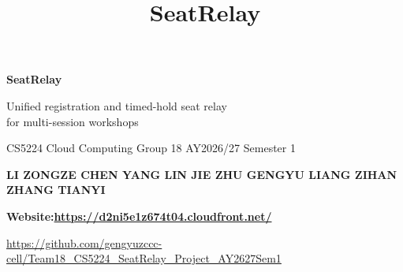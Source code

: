 \documentclass[t,20pt]{beamer}
\title{SeatRelay}
\newcommand{\hl}[1]{\textbf{\color{srBlue}#1}}
\newcommand{\mute}[1]{{\color{srMuted}#1}}
\newcommand{\srspeaker}{}
\newcommand{\speaker}[1]{\renewcommand{\srspeaker}{#1}}
\newif\ifsrids
\newcommand{\who}[2]{\parbox[t]{3.95in}{\textbf{#1}\enspace\mute{#2}}}
\begin{document}
\speaker{LI ZONGZE}
\begin{frame}
  \vspace*{0.95in}
  {\fontsize{60}{66}\selectfont\bfseries SeatRelay\par}
  \vspace{0.12in}
  {\fontsize{28}{34}\selectfont Unified registration and timed-hold seat relay\\
   for multi-session workshops\par}
  \vspace{0.18in}{\color{srBlue}\rule{1.6in}{4pt}}\par\vspace{0.30in}
  CS5224 Cloud Computing \textperiodcentered{} Group 18 \textperiodcentered{} AY2026/27 Semester 1\par
  \vspace{0.14in}
  \ifsrids
    \who{LI ZONGZE}{\IdLiZongze}\hfill\who{CHEN YANG}{\IdChenYang}\hfill\who{LIN JIE}{\IdLinJie}\par
    \who{ZHU GENGYU}{\IdZhuGengyu}\hfill\who{LIANG ZIHAN}{\IdLiangZihan}\hfill\who{ZHANG TIANYI}{\IdZhangTianyi}\par
  \else
    \textbf{LI ZONGZE \textperiodcentered{} CHEN YANG \textperiodcentered{} LIN JIE \textperiodcentered{}
      ZHU GENGYU \textperiodcentered{} LIANG ZIHAN \textperiodcentered{} ZHANG TIANYI}\par
  \fi
  \vspace{0.16in}
  \hl{Website:\enspace\url{https://d2ni5e1z674t04.cloudfront.net/}}\par
  \vspace{0.06in}
  \mute{\url{https://github.com/gengyuzccc-cell/Team18_CS5224_SeatRelay_Project_AY2627Sem1}}\par
\end{frame}
\end{document}
